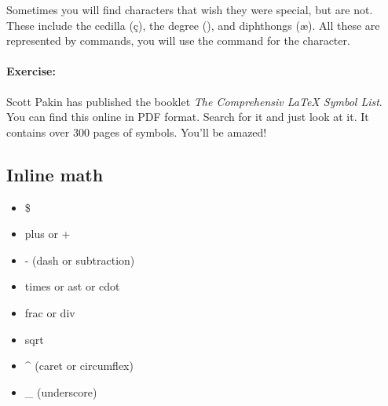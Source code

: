 		Sometimes you will find characters that wish they were special, but are not. These include the cedilla (\c{c}), the degree (\textdegree), and diphthongs (\ae). All these are represented by \Lx{} commands, you will use the command for the character.

		\paragraph{Exercise:}Scott Pakin has published the booklet \textit{The Comprehensiv \LaTeX{} Symbol List}. You can find this online in PDF format. Search for it and just look at it. It contains over 300 pages of symbols. You'll be amazed! 

        \subsection{Inline math}
        \label{Inline-math}
        
        \begin{cmd}
            \begin{itemize}
                \index{\$}
                \index{+}
                \item{\$}
                \item{plus or +}
				\item{- (dash or subtraction)}
                \item{times or ast or cdot}
                \item{frac or div}
                \item{sqrt}
				\item{\^{} (caret or circumflex)}
				\item{\_ (underscore)} 
            \end{itemize}
        \end{cmd}

